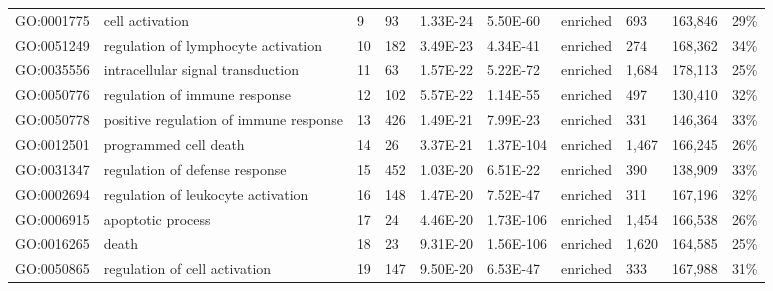 \begin{sidewaystable}[!ht]
\begin{tabular}{lp{2cm}p{1cm}p{1cm}p{1.25cm}p{1.25cm}p{1cm}p{1.25cm}p{1.25cm}p{1.25cm}}
GO:0001775 & cell activation                                & 9                 & 93         & 1.33E-24             & 5.50E-60      & enriched & 693         & 163,846       & 29\%                 \\
GO:0051249 & regulation of lymphocyte activation            & 10                & 182        & 3.49E-23             & 4.34E-41      & enriched & 274         & 168,362       & 34\%                 \\
GO:0035556 & intracellular signal transduction              & 11                & 63         & 1.57E-22             & 5.22E-72      & enriched & 1,684       & 178,113       & 25\%                 \\
GO:0050776 & regulation of immune response                  & 12                & 102        & 5.57E-22             & 1.14E-55      & enriched & 497         & 130,410       & 32\%                 \\
GO:0050778 & positive regulation of immune response         & 13                & 426        & 1.49E-21             & 7.99E-23      & enriched & 331         & 146,364       & 33\%                 \\
GO:0012501 & programmed cell death                          & 14                & 26         & 3.37E-21             & 1.37E-104     & enriched & 1,467       & 166,245       & 26\%                 \\
GO:0031347 & regulation of defense response                 & 15                & 452        & 1.03E-20             & 6.51E-22      & enriched & 390         & 138,909       & 33\%                 \\
GO:0002694 & regulation of leukocyte activation             & 16                & 148        & 1.47E-20             & 7.52E-47      & enriched & 311         & 167,196       & 32\%                 \\
GO:0006915 & apoptotic process                              & 17                & 24         & 4.46E-20             & 1.73E-106     & enriched & 1,454       & 166,538       & 26\%                 \\
GO:0016265 & death                                          & 18                & 23         & 9.31E-20             & 1.56E-106     & enriched & 1,620       & 164,585       & 25\%                 \\
GO:0050865 & regulation of cell activation                  & 19                & 147        & 9.50E-20             & 6.53E-47      & enriched & 333         & 167,988       & 31\%                 \\

\end{tabular}
\end{sidewaystable}
